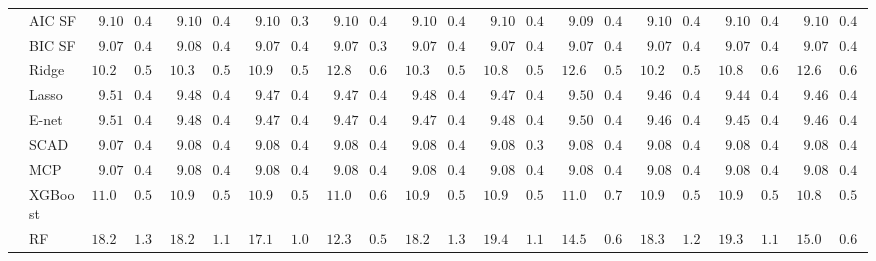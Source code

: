 \begin{tabular}{p{0.2cm}p{1cm}|p{0.6cm}p{0.6cm}|p{0.6cm}p{0.6cm}p{0.6cm}p{0.6cm}p{0.6cm}p{0.6cm}|p{0.6cm}p{0.6cm}p{0.6cm}p{0.6cm}p{0.6cm}p{0.6cm}|p{0.6cm}p{0.6cm}p{0.6cm}p{0.6cm}p{0.6cm}p{0.6cm}}
 & AIC SF  & $\phantom{0}9.10$ & $0.40$ & $\phantom{0}9.10$ & $0.40$ & $\phantom{0}9.10$ & $0.39$ & $\phantom{0}9.10$ & $0.40$ & $\phantom{0}9.10$ & $0.40$ & $\phantom{0}9.10$ & $0.40$ & $\phantom{0}9.09$ & $0.40$ & $\phantom{0}9.10$ & $0.40$ & $\phantom{0}9.10$ & $0.40$ & $\phantom{0}9.10$ & $0.40$ \\
 & BIC SF  & $\phantom{0}9.07$ & $0.40$ & $\phantom{0}9.08$ & $0.40$ & $\phantom{0}9.07$ & $0.40$ & $\phantom{0}9.07$ & $0.39$ & $\phantom{0}9.07$ & $0.40$ & $\phantom{0}9.07$ & $0.40$ & $\phantom{0}9.07$ & $0.40$ & $\phantom{0}9.07$ & $0.40$ & $\phantom{0}9.07$ & $0.40$ & $\phantom{0}9.07$ & $0.40$ \\
 & Ridge  & $10.24$ & $0.50$ & $10.38$ & $0.50$ & $10.93$ & $0.58$ & $12.85$ & $0.64$ & $10.34$ & $0.52$ & $10.85$ & $0.58$ & $12.68$ & $0.58$ & $10.29$ & $0.52$ & $10.82$ & $0.61$ & $12.63$ & $0.66$ \\
 & Lasso  & $\phantom{0}9.51$ & $0.45$ & $\phantom{0}9.48$ & $0.44$ & $\phantom{0}9.47$ & $0.45$ & $\phantom{0}9.47$ & $0.45$ & $\phantom{0}9.48$ & $0.46$ & $\phantom{0}9.47$ & $0.44$ & $\phantom{0}9.50$ & $0.43$ & $\phantom{0}9.46$ & $0.47$ & $\phantom{0}9.44$ & $0.45$ & $\phantom{0}9.46$ & $0.45$ \\
 & E-net  & $\phantom{0}9.51$ & $0.45$ & $\phantom{0}9.48$ & $0.44$ & $\phantom{0}9.47$ & $0.45$ & $\phantom{0}9.47$ & $0.45$ & $\phantom{0}9.47$ & $0.46$ & $\phantom{0}9.48$ & $0.45$ & $\phantom{0}9.50$ & $0.44$ & $\phantom{0}9.46$ & $0.47$ & $\phantom{0}9.45$ & $0.46$ & $\phantom{0}9.46$ & $0.44$ \\
 & SCAD  & $\phantom{0}9.07$ & $0.40$ & $\phantom{0}9.08$ & $0.40$ & $\phantom{0}9.08$ & $0.40$ & $\phantom{0}9.08$ & $0.40$ & $\phantom{0}9.08$ & $0.40$ & $\phantom{0}9.08$ & $0.39$ & $\phantom{0}9.08$ & $0.40$ & $\phantom{0}9.08$ & $0.40$ & $\phantom{0}9.08$ & $0.40$ & $\phantom{0}9.08$ & $0.40$ \\
 & MCP  & $\phantom{0}9.07$ & $0.40$ & $\phantom{0}9.08$ & $0.40$ & $\phantom{0}9.08$ & $0.40$ & $\phantom{0}9.08$ & $0.40$ & $\phantom{0}9.08$ & $0.40$ & $\phantom{0}9.08$ & $0.40$ & $\phantom{0}9.08$ & $0.40$ & $\phantom{0}9.08$ & $0.40$ & $\phantom{0}9.08$ & $0.40$ & $\phantom{0}9.08$ & $0.40$ \\
 & XGBoost  & $11.00$ & $0.59$ & $10.94$ & $0.50$ & $10.91$ & $0.52$ & $11.03$ & $0.69$ & $10.98$ & $0.55$ & $10.94$ & $0.55$ & $11.07$ & $0.71$ & $10.97$ & $0.57$ & $10.93$ & $0.53$ & $10.87$ & $0.50$ \\
 & RF  & $18.28$ & $1.33$ & $18.29$ & $1.11$ & $17.19$ & $1.02$ & $12.36$ & $0.59$ & $18.25$ & $1.36$ & $19.44$ & $1.14$ & $14.55$ & $0.69$ & $18.33$ & $1.24$ & $19.33$ & $1.17$ & $15.06$ & $0.67$ \\

\end{tabular}
